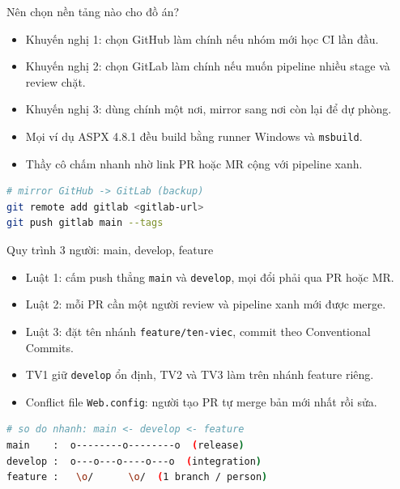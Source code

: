 \begin{frame}[fragile]{Nên chọn nền tảng nào cho đồ án?}
\begin{itemize}
\item Khuyến nghị 1: chọn GitHub làm chính nếu nhóm mới học CI lần đầu.
\item Khuyến nghị 2: chọn GitLab làm chính nếu muốn pipeline nhiều stage và review chặt.
\item Khuyến nghị 3: dùng chính một nơi, mirror sang nơi còn lại để dự phòng.
\item Mọi ví dụ ASPX 4.8.1 đều build bằng runner Windows và \texttt{msbuild}.
\item Thầy cô chấm nhanh nhờ link PR hoặc MR cộng với pipeline xanh.
\end{itemize}
\begin{lstlisting}[language=bash]
# mirror GitHub -> GitLab (backup)
git remote add gitlab <gitlab-url>
git push gitlab main --tags
\end{lstlisting}
\end{frame}

\begin{frame}[fragile]{Quy trình 3 người: main, develop, feature}
\begin{itemize}
\item Luật 1: cấm push thẳng \texttt{main} và \texttt{develop}, mọi đổi phải qua PR hoặc MR.
\item Luật 2: mỗi PR cần một người review và pipeline xanh mới được merge.
\item Luật 3: đặt tên nhánh \texttt{feature/ten-viec}, commit theo Conventional Commits.
\item TV1 giữ \texttt{develop} ổn định, TV2 và TV3 làm trên nhánh feature riêng.
\item Conflict file \texttt{Web.config}: người tạo PR tự merge bản mới nhất rồi sửa.
\end{itemize}
\begin{lstlisting}[language=bash]
# so do nhanh: main <- develop <- feature
main    :  o--------o--------o  (release)
develop :  o---o---o----o---o  (integration)
feature :   \o/      \o/  (1 branch / person)
\end{lstlisting}
\end{frame}

